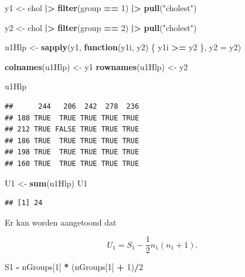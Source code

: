 \documentclass[
  12pt,dutch]{book}
\newenvironment{Shaded}{\begin{snugshade}}{\end{snugshade}}
\newcommand{\AttributeTok}[1]{\textcolor[rgb]{0.13,0.29,0.53}{#1}}
\newcommand{\ControlFlowTok}[1]{\textcolor[rgb]{0.13,0.29,0.53}{\textbf{#1}}}
\newcommand{\DecValTok}[1]{\textcolor[rgb]{0.00,0.00,0.81}{#1}}
\newcommand{\FunctionTok}[1]{\textcolor[rgb]{0.13,0.29,0.53}{\textbf{#1}}}
\newcommand{\NormalTok}[1]{#1}
\newcommand{\OtherTok}[1]{\textcolor[rgb]{0.56,0.35,0.01}{#1}}
\newcommand{\SpecialCharTok}[1]{\textcolor[rgb]{0.81,0.36,0.00}{\textbf{#1}}}
\newcommand{\StringTok}[1]{\textcolor[rgb]{0.31,0.60,0.02}{#1}}
\theoremstyle{definition}
\theoremstyle{definition}
\theoremstyle{definition}
\theoremstyle{definition}
\theoremstyle{remark}
\begin{document}
\begin{Shaded}
\begin{Highlighting}[]
\NormalTok{y1 }\OtherTok{\textless{}{-}}\NormalTok{ chol }\SpecialCharTok{|\textgreater{}}
    \FunctionTok{filter}\NormalTok{(group }\SpecialCharTok{==} \DecValTok{1}\NormalTok{) }\SpecialCharTok{|\textgreater{}}
    \FunctionTok{pull}\NormalTok{(}\StringTok{"cholest"}\NormalTok{)}

\NormalTok{y2 }\OtherTok{\textless{}{-}}\NormalTok{ chol }\SpecialCharTok{|\textgreater{}}
    \FunctionTok{filter}\NormalTok{(group }\SpecialCharTok{==} \DecValTok{2}\NormalTok{) }\SpecialCharTok{|\textgreater{}}
    \FunctionTok{pull}\NormalTok{(}\StringTok{"cholest"}\NormalTok{)}

\NormalTok{u1Hlp }\OtherTok{\textless{}{-}} \FunctionTok{sapply}\NormalTok{(y1, }\ControlFlowTok{function}\NormalTok{(y1i, y2) \{}
\NormalTok{    y1i }\SpecialCharTok{\textgreater{}=}\NormalTok{ y2}
\NormalTok{\}, }\AttributeTok{y2 =}\NormalTok{ y2)}

\FunctionTok{colnames}\NormalTok{(u1Hlp) }\OtherTok{\textless{}{-}}\NormalTok{ y1}
\FunctionTok{rownames}\NormalTok{(u1Hlp) }\OtherTok{\textless{}{-}}\NormalTok{ y2}

\NormalTok{u1Hlp}
\end{Highlighting}
\end{Shaded}

\begin{verbatim}
##      244   206  242  278  236
## 188 TRUE  TRUE TRUE TRUE TRUE
## 212 TRUE FALSE TRUE TRUE TRUE
## 186 TRUE  TRUE TRUE TRUE TRUE
## 198 TRUE  TRUE TRUE TRUE TRUE
## 160 TRUE  TRUE TRUE TRUE TRUE
\end{verbatim}

\begin{Shaded}
\begin{Highlighting}[]
\NormalTok{U1 }\OtherTok{\textless{}{-}} \FunctionTok{sum}\NormalTok{(u1Hlp)}
\NormalTok{U1}
\end{Highlighting}
\end{Shaded}

\begin{verbatim}
## [1] 24
\end{verbatim}

Er kan worden aangetoond dat

\[U_1 = S_1 - \frac{1}{2}n_1(n_1+1).\]

\begin{Shaded}
\begin{Highlighting}[]
\NormalTok{S1 }\SpecialCharTok{{-}}\NormalTok{ nGroups[}\DecValTok{1}\NormalTok{] }\SpecialCharTok{*}\NormalTok{ (nGroups[}\DecValTok{1}\NormalTok{] }\SpecialCharTok{+} \DecValTok{1}\NormalTok{)}\SpecialCharTok{/}\DecValTok{2}
\end{Highlighting}
\end{Shaded}
\end{document}
